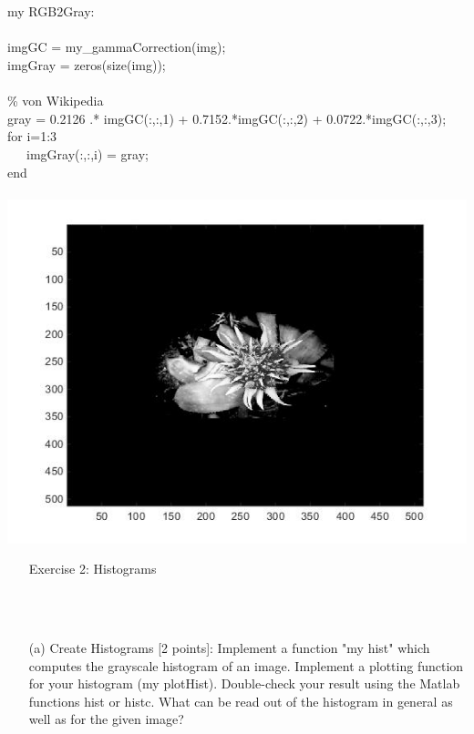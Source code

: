         \\
        \\ \raggedright{ my RGB2Gray:
        \\\\ imgGC = my_gammaCorrection(img);
        \\ imgGray = zeros(size(img));
        \\
        \\ \% von Wikipedia
        \\ gray = 0.2126 .* imgGC(:,:,1) + 0.7152.*imgGC(:,:,2) + 0.0722.*imgGC(:,:,3);
        \\ for i=1:3
        \\ \ \ \ imgGray(:,:,i) = gray;
        \\ end
        \\\\ }
        \includegraphics[scale=0.4]{images/SolutionImagD.jpg}
        \\ 
\pagebreak
    \begin{enumerate}
         \item[Exercise 2:] Histograms
    \end{enumerate}
    \\\\
    \begin{enumerate}        
        \item[(a)] {Create Histograms [2 points]: Implement a function "my hist" which computes the grayscale histogram of an image. Implement a plotting function for your histogram (my plotHist).
            Double-check your result using the Matlab functions hist or histc. What can be read out of the histogram  in general as well as for the given image?}
    \end{enumerate}
